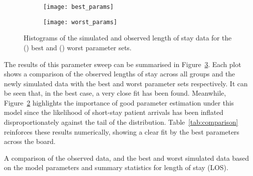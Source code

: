 \begin{figure}
    \centering%
    \begin{subfigure}{.5\imgwidth}
        \texttt{[image: best\_params]}
        \caption{}\label{fig:best_params}
    \end{subfigure}\hfill%
    \begin{subfigure}{.5\imgwidth}
        \texttt{[image: worst\_params]}
        \caption{}\label{fig:worst_params}
    \end{subfigure}
    \caption{Histograms of the simulated and observed length of stay data for
             the () best and ()
             worst parameter sets.}\label{fig:params}
\end{figure}

The results of this parameter sweep can be summarised in
Figure~\ref{fig:params}. Each plot shows a comparison of the observed lengths
of stay across all groups and the newly simulated data with the best and worst
parameter sets respectively. It can be seen that, in the best case, a very close
fit has been found. Meanwhile, Figure~\ref{fig:worst_params} highlights the
importance of good parameter estimation under this model since the likelihood of
short-stay patient arrivals has been inflated disproportionately against the
tail of the distribution. Table~\ref{tab:comparison} reinforces these results
numerically, showing a clear fit by the best parameters across the board.

\begin{table}
    \centering
    \resizebox{\tabwidth}{!}{}
    \caption{A comparison of the observed data, and the best and worst simulated
        data based on the model parameters and summary statistics for length of
    stay (LOS).}\label{tab:comparison}
\end{table}
